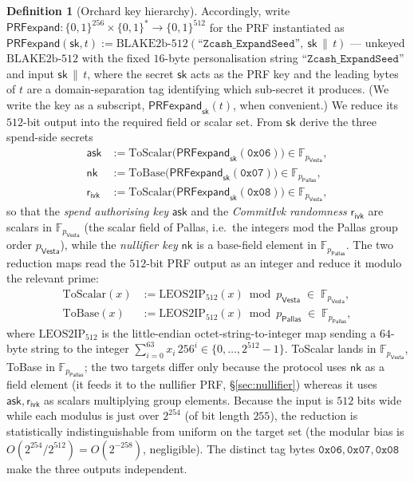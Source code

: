 \documentclass[11pt,a4paper]{article}
\theoremstyle{definition}
\newtheorem{definition}[theorem]{Definition}
\newcommand{\F}{\mathbb{F}}
\newcommand{\Pallas}{\ensuremath{\mathsf{Pallas}}}
\newcommand{\Vesta}{\ensuremath{\mathsf{Vesta}}}
\newcommand{\ask}{\ensuremath{\mathsf{ask}}}
\newcommand{\nksym}{\ensuremath{\mathsf{nk}}}
\newcommand{\rivk}{\ensuremath{\mathsf{r_{ivk}}}}
\begin{document}
\begin{definition}[Orchard key hierarchy]
Accordingly, write
$\mathsf{PRFexpand} : \{0,1\}^{256} \times \{0,1\}^* \to \{0,1\}^{512}$ for
the PRF instantiated as
$\mathsf{PRFexpand}(\mathsf{sk}, t) := \mathrm{BLAKE2b\text{-}512}
(\texttt{``Zcash\_ExpandSeed''},\ \mathsf{sk} \,\|\, t)$ --- unkeyed
$\mathrm{BLAKE2b\text{-}512}$ with the fixed $16$-byte personalisation
string $\texttt{``Zcash\_ExpandSeed''}$ and input $\mathsf{sk} \,\|\, t$,
where the secret $\mathsf{sk}$ acts as the PRF key and the leading bytes of
$t$ are a domain-separation tag identifying which sub-secret it produces.
(We write the key as a subscript, $\mathsf{PRFexpand}_{\mathsf{sk}}(t)$,
when convenient.) We reduce its $512$-bit output into the required field
or scalar set. From $\mathsf{sk}$ derive the three spend-side secrets
\[
\begin{aligned}
\ask &:= \mathrm{ToScalar}\bigl(\mathsf{PRFexpand}_{\mathsf{sk}}(\mathtt{0x06})\bigr) \in \F_{p_{\Vesta}}, \\
\nksym &:= \mathrm{ToBase}\bigl(\mathsf{PRFexpand}_{\mathsf{sk}}(\mathtt{0x07})\bigr) \in \F_{p_{\Pallas}}, \\
\rivk &:= \mathrm{ToScalar}\bigl(\mathsf{PRFexpand}_{\mathsf{sk}}(\mathtt{0x08})\bigr) \in \F_{p_{\Vesta}},
\end{aligned}
\]
so that the \emph{spend authorising key} $\ask$ and the \emph{CommitIvk
randomness} $\rivk$ are scalars in $\F_{p_{\Vesta}}$ (the scalar field of
Pallas, i.e.\ the integers mod the Pallas group order $p_{\Vesta}$), while
the \emph{nullifier key} $\nksym$ is a base-field element in
$\F_{p_{\Pallas}}$. The two reduction maps read the
$512$-bit PRF output as an integer and reduce it modulo the relevant
prime:
\[
\begin{aligned}
\mathrm{ToScalar}(x) &:= \mathrm{LEOS2IP}_{512}(x) \bmod p_{\Vesta} \;\in\; \F_{p_{\Vesta}}, \\
\mathrm{ToBase}(x) &:= \mathrm{LEOS2IP}_{512}(x) \bmod p_{\Pallas} \;\in\; \F_{p_{\Pallas}},
\end{aligned}
\]
where $\mathrm{LEOS2IP}_{512}$ is the little-endian octet-string-to-integer
map sending a $64$-byte string to the integer
$\sum_{i=0}^{63} x_i\,256^{i} \in \{0, \dots, 2^{512}-1\}$. ToScalar lands
in $\F_{p_{\Vesta}}$, ToBase in $\F_{p_{\Pallas}}$; the two targets differ
only because the protocol uses $\nksym$ as a field element (it feeds it to the
nullifier PRF, \S\ref{sec:nullifier}) whereas it uses $\ask, \rivk$ as scalars
multiplying group elements. Because the input is $512$ bits wide while each
modulus is just over $2^{254}$ (of bit length $255$), the reduction is statistically
indistinguishable from uniform on the target set (the modular bias is
$O(2^{254}/2^{512}) = O(2^{-258})$, negligible). The distinct tag bytes
$\mathtt{0x06},\mathtt{0x07},\mathtt{0x08}$ make the three outputs
independent.


\end{definition}
\end{document}

